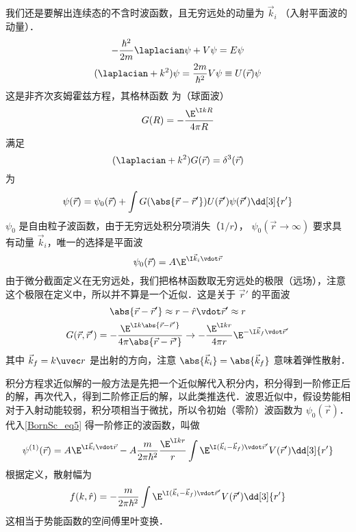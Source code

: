 
我们还是要解出连续态的不含时波函数，且无穷远处的动量为 $\vec k_i$ （入射平面波的动量）．
\begin{gather}
-\frac{\hbar^2}{2m} \laplacian\psi  + V\psi  = E\psi \\
(\laplacian + k^2)\psi  = \frac{2m}{\hbar^2} V\psi  \equiv U(\vec r)\psi
\end{gather}
这是非齐次亥姆霍兹方程，其格林函数%
为（球面波）
\begin{equation}
G(R) =  -\frac{\E^{\I kR}}{4\pi R}
\end{equation}
满足
\begin{equation}
(\laplacian + k^2)G(\vec r) = \delta^3(\vec r)
\end{equation}
为
\begin{equation}\label{BornSc_eq5}
\psi(\vec r) = \psi_0(\vec r) + \int G(\abs{\vec r - \vec r'})U(\vec r')\psi (\vec r') \dd[3]{r'}
\end{equation}
$\psi_0$ 是自由粒子波函数，由于无穷远处积分项消失（$1/r$）， $\psi_0(\vec r\to\infty)$ 要求具有动量 $\vec k_i$，唯一的选择是平面波
\begin{equation}
\psi_0(\vec r) = A\E^{\I\vec k_i \vdot \vec r}
\end{equation}
由于微分截面定义在无穷远处，我们把格林函数取无穷远处的极限（远场），注意这个极限在定义中，所以并不算是一个近似．这是关于 $\vec r'$ 的平面波
\begin{gather}
\abs{\vec r - \vec r'} \approx r - \hat r \vdot \vec r' \approx r\\
G(\vec r, \vec r') =  - \frac{\E^{\I k \abs{\vec r - \vec r'}}}{4\pi\abs{\vec r - \vec r'}} \to  - \frac{\E^{\I kr}}{4\pi r} \E^{-\I \vec k_f \vdot \vec r'}
\end{gather}
其中 $\vec k_f = k\uvec r$ 是出射的方向，注意 $\abs{\vec k_i} = \abs{\vec k_f}$ 意味着弹性散射．

积分方程求近似解的一般方法是先把一个近似解代入积分内，积分得到一阶修正后的解，再次代入，得到二阶修正后的解，以此类推迭代．波恩近似中，假设势能相对于入射动能较弱，积分项相当于微扰，所以令初始（零阶）波函数为 $\psi_0(\vec r)$．代入\autoref{BornSc_eq5} 得一阶修正的波函数，叫做
\begin{equation}
\psi ^{(1)}(\vec r) = A\E^{\I\vec k_i \vdot \vec r} - A \frac{m}{2\pi\hbar^2} \frac{\E^{\I kr}}{r}\int \E^{\I (\vec k_i - \vec k_f) \vdot \vec r'} V(\vec r') \dd[3]{r'}
\end{equation}
根据定义，散射幅为
\begin{equation}
f(k, \hat r) =  - \frac{m}{2\pi\hbar^2} \int \E^{\I (\vec k_i - \vec k_f) \vdot \vec r'} V(\vec r') \dd[3]{r'}
\end{equation}
这相当于势能函数的空间傅里叶变换．

